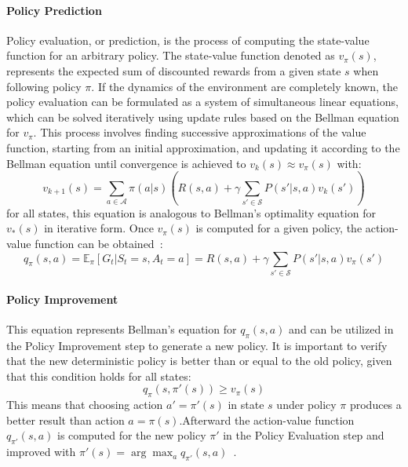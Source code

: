 \documentclass[../xlapes02]{subfiles}
\begin{document}
    \paragraph{Policy Prediction}\label{par:policy-prediction}
    Policy evaluation, or prediction, is the process of computing the state-value function for an arbitrary policy. The state-value function denoted as $v_\pi(s)$, represents the expected sum of discounted rewards from a given state $s$ when following policy $\pi$. If the dynamics of the environment are completely known, the policy evaluation can be formulated as a system of simultaneous linear equations, which can be solved iteratively using update rules based on the Bellman equation for $v_\pi$. This process involves finding successive approximations of the value function, starting from an initial approximation, and updating it according to the Bellman equation until convergence is achieved to $v_k(s) \approx v_{\pi}(s)$ with:
    \begin{equation}
        v_{k+1}(s)=\sum_{a\in\mathcal{A}}\pi(a|s)\left(R(s,a)+\gamma\sum_{s'\in\mathcal{S}}P(s'|s,a)v_k(s')\right)
    \end{equation}
    for all states, this equation is analogous to Bellman's optimality equation for $v_*(s)$ in iterative form. Once $v_\pi(s)$ is computed for a given policy, the action-value function can be obtained~\cite{sutton2018reinforcement, FITMT25127}:
    \begin{equation}
        q_{\pi}(s,a)=\mathbb{E}_{\pi}[G_t|S_t=s,A_t=a]=R(s,a)+\gamma\sum_{s'\in\mathcal{S}}P(s'|s,a)v_{\pi}(s')
    \end{equation}

    \paragraph{Policy Improvement}\label{par:policy-improvement}
    This equation represents Bellman's equation for $q_\pi(s,a)$ and can be utilized in the Policy Improvement step to generate a new policy. It is important to verify that the new deterministic policy is better than or equal to the old policy, given that this condition holds for all states:
    \begin{equation}
        q_{\pi}(s,\pi'(s))\geq v_{\pi}(s)
    \end{equation}
    This means that choosing action $a' = \pi'(s)$ in state $s$ under policy $\pi$ produces a better result than action $a = \pi(s)$.Afterward the action-value function $q_{\pi'}(s, a)$ is computed for the new policy $\pi'$ in the Policy Evaluation step and improved with $\pi'(s) = \arg\max_a q_{\pi'}(s, a)$~\cite{sutton2018reinforcement, FITMT25127}.
\end{document}
